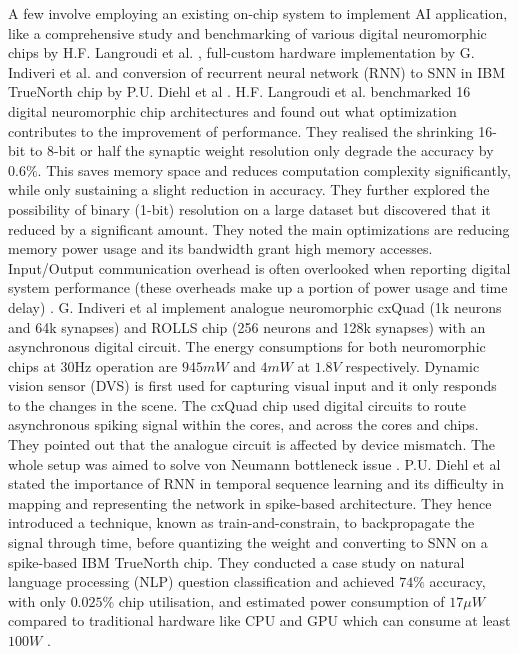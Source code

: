 A few involve employing an existing on-chip system to implement AI application, like a comprehensive study and benchmarking of various digital neuromorphic chips by H.F. Langroudi et al. \cite{langroudi}, full-custom hardware implementation by G. Indiveri et al. \cite{indiveri} and conversion of recurrent neural network (RNN) to SNN in IBM TrueNorth chip by P.U. Diehl et al \cite{diehl}. H.F. Langroudi et al. benchmarked 16 digital neuromorphic chip architectures and found out what optimization contributes to the improvement of performance. They realised the shrinking 16-bit to 8-bit or half the synaptic weight resolution only degrade the accuracy by $0.6\%$. This saves memory space and reduces computation complexity significantly, while only sustaining a slight reduction in accuracy. They further explored the possibility of binary (1-bit) resolution on a large dataset but discovered that it reduced by a significant amount. They noted the main optimizations are reducing memory power usage and its bandwidth grant high memory accesses. Input/Output communication overhead is often overlooked when reporting digital system performance (these overheads make up a portion of power usage and time delay) \cite{langroudi}. G. Indiveri et al implement analogue neuromorphic cxQuad (1k neurons and 64k synapses) and ROLLS chip (256 neurons and 128k synapses) with an asynchronous digital circuit. The energy consumptions for both neuromorphic chips at 30Hz operation are $945mW$ and $4mW$ at $1.8V$ respectively. Dynamic vision sensor (DVS) is first used for capturing visual input and it only responds to the changes in the scene. The cxQuad chip used digital circuits to route asynchronous spiking signal within the cores, and across the cores and chips. They pointed out that the analogue circuit is affected by device mismatch. The whole setup was aimed to solve von Neumann bottleneck issue \cite{indiveri}. P.U. Diehl et al stated the importance of RNN in temporal sequence learning and its difficulty in mapping and representing the network in spike-based architecture. They hence introduced a technique, known as train-and-constrain, to backpropagate the signal through time, before quantizing the weight and converting to SNN on a spike-based IBM TrueNorth chip. They conducted a case study on natural language processing (NLP) question classification and achieved $74\%$ accuracy, with only $0.025\%$ chip utilisation, and estimated power consumption of $17\mu W$ compared to traditional hardware like CPU and GPU which can consume at least $100W$ \cite{diehl}.


